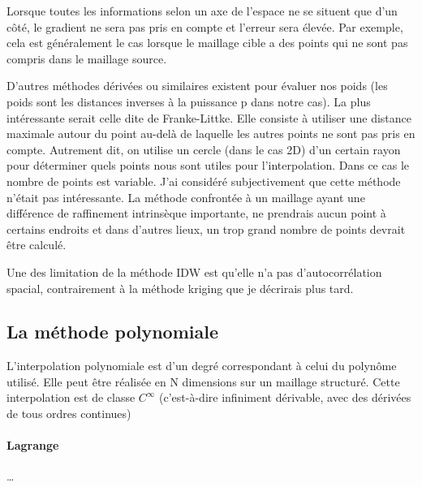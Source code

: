 Lorsque toutes les informations selon un axe de l'espace ne se situent que d'un côté, le gradient ne sera pas pris en compte et l'erreur sera élevée. Par exemple, cela est généralement le cas lorsque le maillage cible a des points qui ne sont pas compris dans le maillage source.

D'autres méthodes dérivées ou similaires existent pour évaluer nos poids (les poids sont les distances inverses à la puissance p dans notre cas). La plus intéressante serait celle dite de Franke-Littke. Elle consiste à utiliser une distance maximale autour du point au-delà de laquelle les autres points ne sont pas pris en compte. Autrement dit, on utilise un cercle (dans le cas 2D) d'un certain rayon pour déterminer quels points nous sont utiles pour l'interpolation. Dans ce cas le nombre de points est variable.
J'ai considéré subjectivement que cette méthode n'était pas intéressante. La méthode confrontée à un maillage ayant une différence de raffinement intrinsèque importante, ne prendrais aucun point à certains endroits et dans d'autres lieux, un trop grand nombre de points devrait être calculé.

Une des limitation\cite{idw-mapscaping} de la méthode IDW est qu'elle n'a pas d'autocorrélation spacial, contrairement à la méthode kriging que je décrirais plus tard.

\vspace{0,5 cm}




\subsection{La méthode polynomiale}

L'interpolation polynomiale est d'un degré correspondant à celui du polynôme utilisé. Elle peut être réalisée en N dimensions sur un maillage structuré. Cette interpolation est de classe \(C^\infty\) (c'est-à-dire infiniment dérivable, avec des dérivées de tous ordres continues)

\paragraph{Lagrange}
\vspace{0.5cm}
\dots
